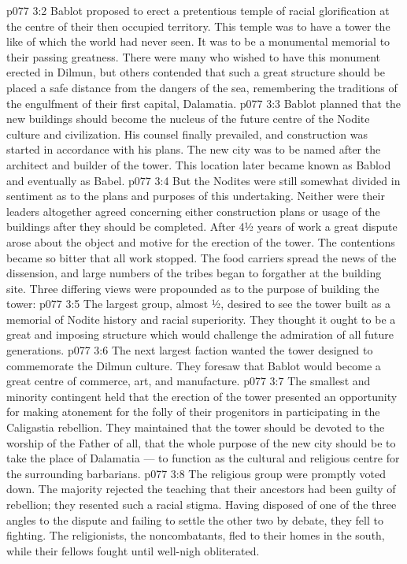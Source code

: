 \vs p077 3:2 Bablot proposed to erect a pretentious temple of racial glorification at the centre of their then occupied territory. This temple was to have a tower the like of which the world had never seen. It was to be a monumental memorial to their passing greatness. There were many who wished to have this monument erected in Dilmun, but others contended that such a great structure should be placed a safe distance from the dangers of the sea, remembering the traditions of the engulfment of their first capital, Dalamatia.
\vs p077 3:3 Bablot planned that the new buildings should become the nucleus of the future centre of the Nodite culture and civilization. His counsel finally prevailed, and construction was started in accordance with his plans. The new city was to be named  after the architect and builder of the tower. This location later became known as Bablod and eventually as Babel.
\vs p077 3:4 But the Nodites were still somewhat divided in sentiment as to the plans and purposes of this undertaking. Neither were their leaders altogether agreed concerning either construction plans or usage of the buildings after they should be completed. After 4½ years of work a great dispute arose about the object and motive for the erection of the tower. The contentions became so bitter that all work stopped. The food carriers spread the news of the dissension, and large numbers of the tribes began to forgather at the building site. Three differing views were propounded as to the purpose of building the tower:
\vs p077 3:5 \bibnobreakspace The largest group, almost ½, desired to see the tower built as a memorial of Nodite history and racial superiority. They thought it ought to be a great and imposing structure which would challenge the admiration of all future generations.
\vs p077 3:6 \bibnobreakspace The next largest faction wanted the tower designed to commemorate the Dilmun culture. They foresaw that Bablot would become a great centre of commerce, art, and manufacture.
\vs p077 3:7 \bibnobreakspace The smallest and minority contingent held that the erection of the tower presented an opportunity for making atonement for the folly of their progenitors in participating in the Caligastia rebellion. They maintained that the tower should be devoted to the worship of the Father of all, that the whole purpose of the new city should be to take the place of Dalamatia --- to function as the cultural and religious centre for the surrounding barbarians.
\vs p077 3:8 \pc The religious group were promptly voted down. The majority rejected the teaching that their ancestors had been guilty of rebellion; they resented such a racial stigma. Having disposed of one of the three angles to the dispute and failing to settle the other two by debate, they fell to fighting. The religionists, the noncombatants, fled to their homes in the south, while their fellows fought until well\hyp{}nigh obliterated.
